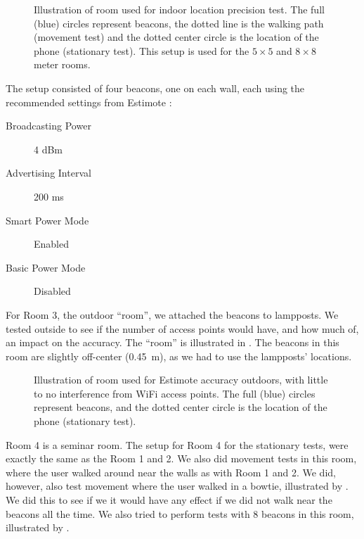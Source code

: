 \begin{figure}[!htb]
    \centering
    
    \caption{Illustration of room used for indoor location precision test. The full (blue) circles represent beacons, the dotted line is the walking path (movement test) and the dotted center circle is the location of the phone (stationary test). This setup is used for the $5 \times 5$ and $8 \times 8$ meter rooms.}
    \label{fig:precisiontest:illustration}
\end{figure}

The setup consisted of four beacons, one on each wall, 
each using the recommended settings from Estimote \cite{estimote:settings}:
\begin{description}
    \item[Broadcasting Power]{4 dBm}
    \item[Advertising Interval]{200 ms}
    \item[Smart Power Mode]{Enabled}
    \item[Basic Power Mode]{Disabled}
\end{description}

For Room 3, the outdoor ``room'',
we attached the beacons to lampposts. 
We tested outside to see if the number of access points would have, and how much of, 
an impact on the accuracy. 
The ``room'' is illustrated in . 
The beacons in this room are slightly off-center (\SI{0.45}{\meter}), 
as we had to use the lampposts' locations. 

\begin{figure}[!htb]
    \centering
    
    \caption{Illustration of room used for Estimote accuracy outdoors, with little to no interference from WiFi access points. The full (blue) circles represent beacons, and the dotted center circle is the location of the phone (stationary test).}
    \label{fig:outdoortest}
\end{figure}

Room 4 is a seminar room. 
The setup for Room 4 for the stationary tests,
were exactly the same as the Room 1 and 2. 
We also did movement tests in this room, 
where the user walked around near the walls as with Room 1 and 2. 
We did, however, also test movement where the user walked in a bowtie,
illustrated by . 
We did this to see if we it would have any effect if we did not walk near the beacons all the time. 
We also tried to perform tests with \num{8} beacons in this room, 
illustrated by . 

